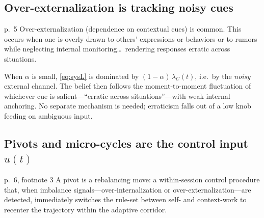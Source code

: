 \documentclass[11pt]{article}
\begin{document}
\subsection{Over-externalization is tracking noisy cues}

\begin{fromtext}{p.~5}
Over-externalization (dependence on contextual cues) is common. This occurs when one is overly drawn to others' expressions or behaviors or to rumors while neglecting internal monitoring\dots\ rendering responses erratic across situations.
\end{fromtext}

\noindent When $\alpha$ is small, \eqref{eq:sysL} is dominated by $(1-\alpha)\,\lambda_C(t)$, i.e.\ by the \emph{noisy} external channel. The belief then follows the moment-to-moment fluctuation of whichever cue is salient---``erratic across situations''---with weak internal anchoring. No separate mechanism is needed; erraticism falls out of a low knob feeding on ambiguous input.

\subsection{Pivots and micro-cycles are the control input \texorpdfstring{$u(t)$}{u(t)}}

\begin{fromtext}{p.~6, footnote 3}
A pivot is a rebalancing move: a within-session control procedure that, when imbalance signals---over-internalization or over-externalization---are detected, immediately switches the rule-set between self- and context-work to recenter the trajectory within the adaptive corridor.
\end{fromtext}
\end{document}
